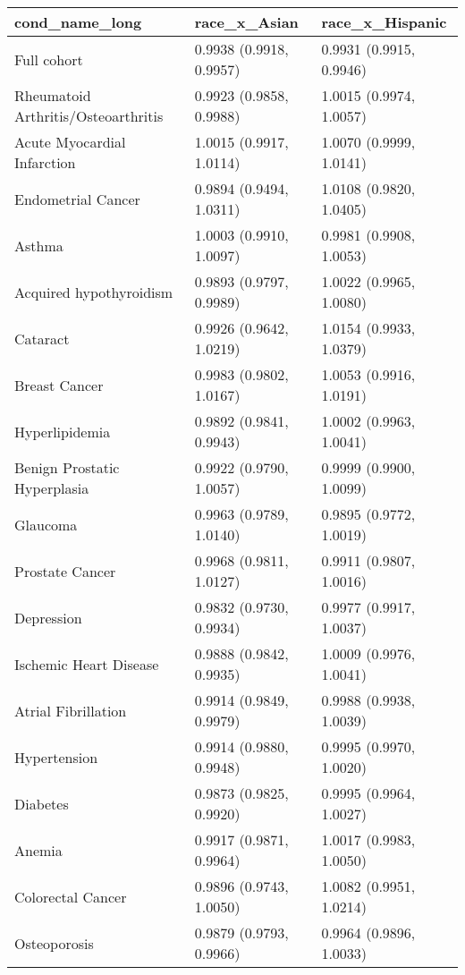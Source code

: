 \begin{table}[ht]
\centering
\begin{tabular}{lll}
  \hline
cond_name_long & race_x_Asian & race_x_Hispanic \\ 
  \hline
Full cohort & 0.9938 (0.9918, 0.9957) & 0.9931 (0.9915, 0.9946) \\ 
  Rheumatoid Arthritis/Osteoarthritis & 0.9923 (0.9858, 0.9988) & 1.0015 (0.9974, 1.0057) \\ 
  Acute Myocardial Infarction & 1.0015 (0.9917, 1.0114) & 1.0070 (0.9999, 1.0141) \\ 
  Endometrial Cancer & 0.9894 (0.9494, 1.0311) & 1.0108 (0.9820, 1.0405) \\ 
  Asthma & 1.0003 (0.9910, 1.0097) & 0.9981 (0.9908, 1.0053) \\ 
  Acquired hypothyroidism & 0.9893 (0.9797, 0.9989) & 1.0022 (0.9965, 1.0080) \\ 
  Cataract & 0.9926 (0.9642, 1.0219) & 1.0154 (0.9933, 1.0379) \\ 
  Breast Cancer & 0.9983 (0.9802, 1.0167) & 1.0053 (0.9916, 1.0191) \\ 
  Hyperlipidemia & 0.9892 (0.9841, 0.9943) & 1.0002 (0.9963, 1.0041) \\ 
  Benign Prostatic Hyperplasia & 0.9922 (0.9790, 1.0057) & 0.9999 (0.9900, 1.0099) \\ 
  Glaucoma & 0.9963 (0.9789, 1.0140) & 0.9895 (0.9772, 1.0019) \\ 
  Prostate Cancer & 0.9968 (0.9811, 1.0127) & 0.9911 (0.9807, 1.0016) \\ 
  Depression & 0.9832 (0.9730, 0.9934) & 0.9977 (0.9917, 1.0037) \\ 
  Ischemic Heart Disease & 0.9888 (0.9842, 0.9935) & 1.0009 (0.9976, 1.0041) \\ 
  Atrial Fibrillation & 0.9914 (0.9849, 0.9979) & 0.9988 (0.9938, 1.0039) \\ 
  Hypertension & 0.9914 (0.9880, 0.9948) & 0.9995 (0.9970, 1.0020) \\ 
  Diabetes & 0.9873 (0.9825, 0.9920) & 0.9995 (0.9964, 1.0027) \\ 
  Anemia & 0.9917 (0.9871, 0.9964) & 1.0017 (0.9983, 1.0050) \\ 
  Colorectal Cancer & 0.9896 (0.9743, 1.0050) & 1.0082 (0.9951, 1.0214) \\ 
  Osteoporosis & 0.9879 (0.9793, 0.9966) & 0.9964 (0.9896, 1.0033) \\ 

\end{tabular}
\end{table}

